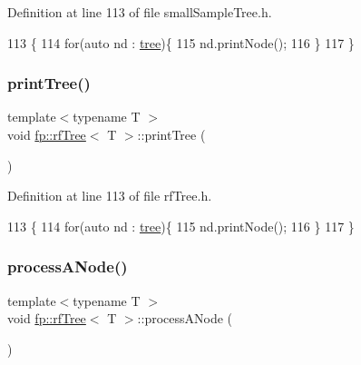 Definition at line 113 of file small\+Sample\+Tree.\+h.


\begin{DoxyCode}
113                                 \{
114                     \textcolor{keywordflow}{for}(\textcolor{keyword}{auto} nd : \hyperlink{classtree}{tree})\{
115                         nd.printNode();
116                     \}
117                 \}
\end{DoxyCode}
\mbox{\label{classfp_1_1rfTree_a89d982d5df6e068079d2fff5f6c15f58}} 
\subsubsection{\texorpdfstring{print\+Tree()}{printTree()}\hspace{0.1cm}{\footnotesize\ttfamily [2/2]}}
{\footnotesize\ttfamily template$<$typename T $>$ \\
void \hyperlink{classfp_1_1rfTree}{fp\+::rf\+Tree}$<$ T $>$\+::print\+Tree (\begin{DoxyParamCaption}{ }\end{DoxyParamCaption})\hspace{0.3cm}{\ttfamily [inline]}}



Definition at line 113 of file rf\+Tree.\+h.


\begin{DoxyCode}
113                                 \{
114                     \textcolor{keywordflow}{for}(\textcolor{keyword}{auto} nd : \hyperlink{classtree}{tree})\{
115                         nd.printNode();
116                     \}
117                 \}
\end{DoxyCode}
\mbox{\label{classfp_1_1rfTree_ab7760333f6857ab7ce2ee29a7bc16e65}} 
\subsubsection{\texorpdfstring{process\+A\+Node()}{processANode()}\hspace{0.1cm}{\footnotesize\ttfamily [1/2]}}
{\footnotesize\ttfamily template$<$typename T $>$ \\
void \hyperlink{classfp_1_1rfTree}{fp\+::rf\+Tree}$<$ T $>$\+::process\+A\+Node (\begin{DoxyParamCaption}{ }\end{DoxyParamCaption})\hspace{0.3cm}{\ttfamily [inline]}}



